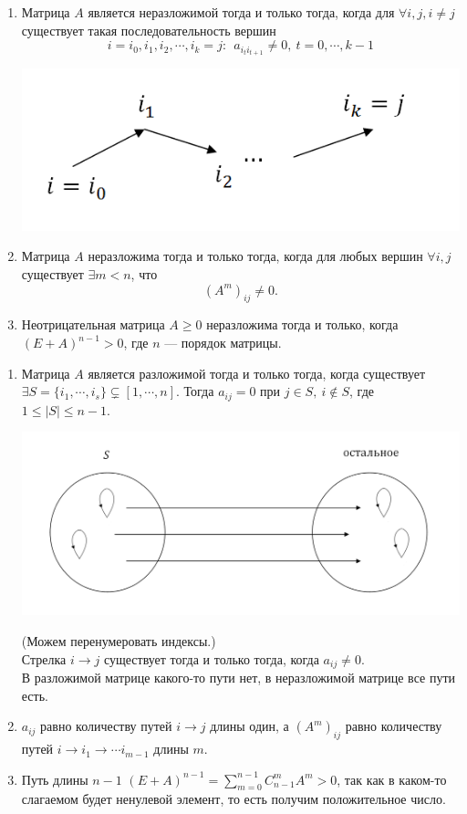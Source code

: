 \documentclass[12pt]{article}
\theoremstyle{definition}
\numberwithin{equation}{section}
\begin{document}
	\begin{enumerate}
		\item Матрица $A$ является неразложимой тогда и только тогда, когда для $\forall i, j, i\neq j$ существует такая последовательность вершин $$i=i_0, i_1, i_2, \cdots, i_k=j:~~a_{i_t i_{t+1}}\neq 0,~t=0, \cdots, k-1$$
		\begin{center}
			\includegraphics[scale=0.6]{l14_2.png}\\
		\end{center}
		\item Матрица $A$ неразложима тогда и только тогда, когда для любых вершин $\forall i, j$ существует $\exists m<n$, что $$(A^m)_{ij}\neq 0.$$
		\item Неотрицательная матрица $A\geqslant 0$ неразложима тогда и только, когда $(E+A)^{n-1}>0$, где $n$ --- порядок матрицы. 
	\end{enumerate}
	\begin{enumerate}
		\item Матрица $A$ является разложимой тогда и только тогда, когда существует $\exists S=\{i_1,\cdots, i_s\} \subsetneq [1, \cdots, n]$. Тогда $a_{ij}=0$ при $j\in S,~i\notin S$, где $1\leqslant |S| \leqslant n-1$.\\
		\begin{center}
			\includegraphics[scale=0.6]{l14_3.png}\\
		\end{center}
		(Можем перенумеровать индексы.)\\
		Стрелка $i\to j$ существует тогда и только тогда, когда $a_{ij}\neq 0$.\\
		В разложимой матрице какого-то пути нет, в неразложимой матрице все пути есть.
		\item $a_{ij}$ равно количеству путей $i\to j$ длины один, а $(A^m)_{ij}$ равно количеству путей $i\to i_1\to \cdots i_{m-1}$ длины $m$.
		\item Путь длины $n-1$ $(E+A)^{n-1}=\sum\limits_{m=0}^{n-1}C_{n-1}^mA^m>0$, так как в каком-то слагаемом будет ненулевой элемент, то есть получим положительное число. 
	\end{enumerate}
\end{document}
